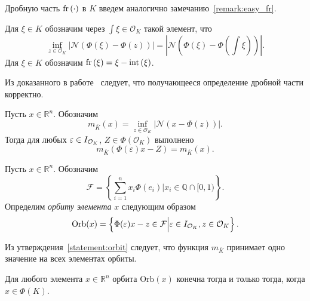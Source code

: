 \documentclass[_00_dissertation.tex]{subfiles}
\begin{document}
Дробную часть $\textrm{fr}\left(\cdot\right)$ в $K$ введем аналогично замечанию~\ref{remark:easy_fr}.

\begin{definition}
    Для $\xi \in K$ обозначим через $\int{\xi} \in \mathcal{O}_K$ такой элемент, что
    \begin{equation*}
        \inf\limits_{z\in\mathcal{O}_K} |\mathcal{N}(\Phi(\xi) - \Phi(z))| = |\mathcal{N}(\Phi(\xi) - \Phi(\int{\xi}))|.
    \end{equation*}
    Для $\xi \in K$ обозначим $\textrm{fr}\left(\xi\right) = \xi - \textrm{int}\left(\xi\right)$.
\end{definition}

Из доказанного в работе~\cite[с.~1400]{source:Lezowski} следует, что получающееся определение дробной части корректно.

\begin{statement}\label{statement:orbit} \cite[с.~1400]{source:Lezowski}
    Пусть $x \in \mathbb{R}^n$.
    Обозначим
    \begin{equation*}
        m_{\overline{K}}(x) = \inf_{z\in\mathcal{O}_K} |\mathcal{N}(x - \Phi(z))|.
    \end{equation*}
    Тогда для любых $\varepsilon \in I_{\mathcal{O}_K}$, $Z \in \Phi(\mathcal{O}_K)$ выполнено
    \begin{equation*}
        m_{\overline{K}}(\Phi(\varepsilon)x - Z) = m_{\overline{K}}(x).
    \end{equation*}
\end{statement}

\begin{definition}
    Пусть $x\in \mathbb{R}^n$.
    Обозначим
    \begin{equation*}
        \mathcal{F} = \left\{
            \sum\limits_{i=1}^n x_i\Phi(e_i) \Big| x_i \in \mathbb{Q}\cap[0, 1)
        \right\}.
    \end{equation*}
    Определим \emph{орбиту элемента} $x$ следующим образом 
    \begin{equation*}
        \textrm{Orb}(x) = \left\{
        \Phi(\varepsilon)x - z \in \mathcal{F} \Big| \varepsilon \in I_{\mathcal{O}_K}, z \in \mathcal{O}_K
    \right\}.
    \end{equation*}
\end{definition}

Из утверждения~\ref{statement:orbit} следует, что функция $m_{\overline{K}}$ принимает одно значение на всех элементах орбиты.

\begin{statement} \cite[с.~1403]{source:Lezowski}
    Для любого элемента $x\in \mathbb{R}^n$ орбита $\textrm{Orb}(x)$ конечна тогда и только тогда, когда $x \in \Phi(K)$.
\end{statement}
\end{document}

